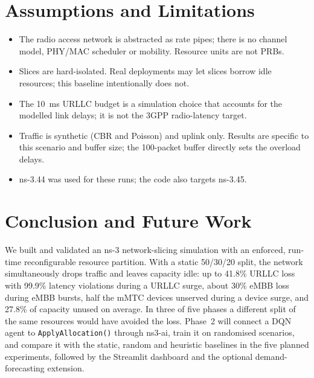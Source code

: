 \documentclass[conference]{IEEEtran}
\begin{document}
\section{Assumptions and Limitations}
\begin{itemize}
\item The radio access network is abstracted as rate pipes; there is no channel model, PHY/MAC scheduler or mobility. Resource units are not PRBs.
\item Slices are hard-isolated. Real deployments may let slices borrow idle resources; this baseline intentionally does not.
\item The 10~ms URLLC budget is a simulation choice that accounts for the modelled link delays; it is not the 3GPP radio-latency target.
\item Traffic is synthetic (CBR and Poisson) and uplink only. Results are specific to this scenario and buffer size; the 100-packet buffer directly sets the overload delays.
\item ns-3.44 was used for these runs; the code also targets ns-3.45.
\end{itemize}

\section{Conclusion and Future Work}
We built and validated an ns-3 network-slicing simulation with an enforced, run-time reconfigurable resource partition. With a static 50/30/20 split, the network simultaneously drops traffic and leaves capacity idle: up to 41.8\% URLLC loss with 99.9\% latency violations during a URLLC surge, about 30\% eMBB loss during eMBB bursts, half the mMTC devices unserved during a device surge, and 27.8\% of capacity unused on average. In three of five phases a different split of the same resources would have avoided the loss. Phase~2 will connect a DQN agent to \texttt{ApplyAllocation()} through ns3-ai, train it on randomised scenarios, and compare it with the static, random and heuristic baselines in the five planned experiments, followed by the Streamlit dashboard and the optional demand-forecasting extension.
\end{document}
